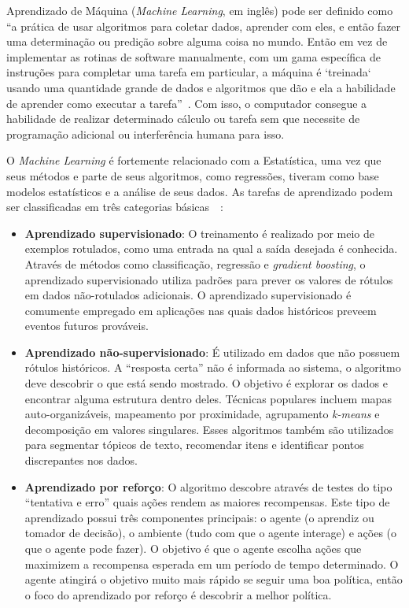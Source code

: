 \documentclass[portugues]{ic-tese}
\begin{document}
Aprendizado de Máquina (\textit{Machine Learning}, em inglês) pode ser definido como “a prática de usar algoritmos para coletar dados, aprender com eles, e então fazer uma determinação ou predição sobre alguma coisa no mundo. Então em vez de implementar as rotinas de software manualmente, com um gama específica de instruções para completar uma tarefa em particular, a máquina é `treinada` usando uma quantidade grande de dados e algoritmos que dão e ela a habilidade de aprender como executar a tarefa”~\citep{Copeland_2016}. Com isso, o computador consegue a habilidade de realizar determinado cálculo ou tarefa sem que necessite de programação adicional ou interferência humana para isso.

O \textit{Machine Learning} é fortemente relacionado com a Estatística, uma vez que seus métodos e parte de seus algoritmos, como regressões, tiveram como base modelos estatísticos e a análise de seus dados. As tarefas de aprendizado podem ser classificadas em três categorias básicas~\citep{MLWikipedia_2021}~\citep{MLSAS_2021}:

\begin{itemize}
\item \textbf{Aprendizado supervisionado}: O treinamento é realizado por meio de exemplos rotulados, como uma entrada na qual a saída desejada é conhecida. Através de métodos como classificação, regressão e \textit{gradient boosting}, o aprendizado supervisionado utiliza padrões para prever os valores de rótulos em dados não-rotulados adicionais. O aprendizado supervisionado é comumente empregado em aplicações nas quais dados históricos preveem eventos futuros prováveis.
\item \textbf{Aprendizado não-supervisionado}: É utilizado em dados que não possuem rótulos históricos. A “resposta certa” não é informada ao sistema, o algoritmo deve descobrir o que está sendo mostrado. O objetivo é explorar os dados e encontrar alguma estrutura dentro deles. Técnicas populares incluem mapas auto-organizáveis, mapeamento por proximidade, agrupamento \textit{k-means} e decomposição em valores singulares. Esses algoritmos também são utilizados para segmentar tópicos de texto, recomendar itens e identificar pontos discrepantes nos dados.
\item \textbf{Aprendizado por reforço}: O algoritmo descobre através de testes do tipo “tentativa e erro” quais ações rendem as maiores recompensas. Este tipo de aprendizado possui três componentes principais: o agente (o aprendiz ou tomador de decisão), o ambiente (tudo com que o agente interage) e ações (o que o agente pode fazer). O objetivo é que o agente escolha ações que maximizem a recompensa esperada em um período de tempo determinado. O agente atingirá o objetivo muito mais rápido se seguir uma boa política, então o foco do aprendizado por reforço é descobrir a melhor política.
\end{itemize}
\end{document}
